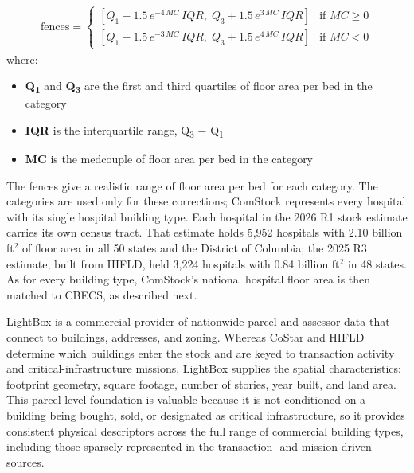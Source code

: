 \begin{align}
\label{eqn:adjusted_boxplot}
\text{fences} =
\begin{cases}
  \left[Q_{1} - 1.5\, e^{-4\,MC}\, IQR,\; Q_{3} + 1.5\, e^{3\,MC}\, IQR\right] & \text{if } MC \geq 0 \\
  \left[Q_{1} - 1.5\, e^{-3\,MC}\, IQR,\; Q_{3} + 1.5\, e^{4\,MC}\, IQR\right] & \text{if } MC < 0
\end{cases}
\end{align}
where:\\
\begin{itemize}
\item \textbf{Q\textsubscript{1}} and \textbf{Q\textsubscript{3}} are the first and third quartiles of floor area per bed in the category\\
\item \textbf{IQR} is the interquartile range, Q\textsubscript{3} $-$ Q\textsubscript{1}\\
\item \textbf{MC} is the medcouple of floor area per bed in the category
\end{itemize}

The fences give a realistic range of floor area per bed for each category. The categories are used only for these corrections; ComStock represents every hospital with its single hospital building type. Each hospital in the 2026 R1 stock estimate carries its own census tract. That estimate holds 5,952 hospitals with 2.10 billion ft$^2$ of floor area in all 50 states and the District of Columbia; the 2025 R3 estimate, built from HIFLD, held 3,224 hospitals with 0.84 billion ft$^2$ in 48 states. As for every building type, ComStock's national hospital floor area is then matched to CBECS, as described next.

LightBox is a commercial provider of nationwide parcel and assessor data that connect to buildings, addresses, and zoning. Whereas CoStar and HIFLD determine which buildings enter the stock and are keyed to transaction activity and critical-infrastructure missions, LightBox supplies the spatial characteristics: footprint geometry, square footage, number of stories, year built, and land area. This parcel-level foundation is valuable because it is not conditioned on a building being bought, sold, or designated as critical infrastructure, so it provides consistent physical descriptors across the full range of commercial building types, including those sparsely represented in the transaction- and mission-driven sources. 

